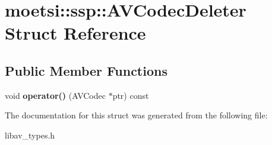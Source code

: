 \hypertarget{structmoetsi_1_1ssp_1_1AVCodecDeleter}{}\section{moetsi\+:\+:ssp\+:\+:A\+V\+Codec\+Deleter Struct Reference}
\label{structmoetsi_1_1ssp_1_1AVCodecDeleter}
\subsection*{Public Member Functions}
\begin{DoxyCompactItemize}
\item 
\mbox{\label{structmoetsi_1_1ssp_1_1AVCodecDeleter_ac228d28e33937b5f959c16d3521ace27}} 
void {\bfseries operator()} (A\+V\+Codec $\ast$ptr) const
\end{DoxyCompactItemize}


The documentation for this struct was generated from the following file\+:\begin{DoxyCompactItemize}
\item 
libav\+\_\+types.\+h\end{DoxyCompactItemize}
